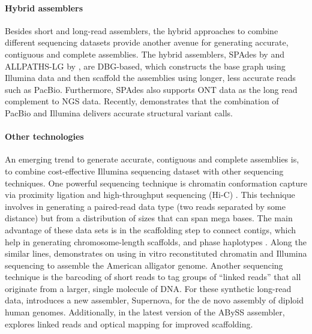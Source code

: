 \paragraph{Hybrid assemblers}
Besides short and long-read assemblers, the hybrid approaches to combine different sequencing datasets provide another avenue for generating accurate, contiguous and complete assemblies. 
The hybrid assemblers, SPAdes by \cite{bankevich2012spades} and ALLPATHS-LG by \cite{gnerre2011high}, are DBG-based, which constructs the base graph using Illumina data and then scaffold the assemblies using longer, less accurate reads such as PacBio. 
Furthermore, SPAdes also supports ONT data as the long read complement to NGS data. 
Recently, \cite{fan2017hysa} demonstrates that the combination of PacBio and Illumina delivers accurate structural variant calls.

\paragraph{Other technologies}
An emerging trend to generate accurate, contiguous and complete assemblies is, to combine cost-effective Illumina sequencing dataset with other sequencing techniques. 
One powerful sequencing technique is chromatin conformation capture via proximity ligation and high-throughput sequencing (Hi-C) \citep{lieberman2009comprehensive}. 
This technique involves in generating a paired-read data type (two reads separated by some distance) but from a distribution of sizes that can span mega bases. 
The main advantage of these data sets is in the scaffolding step to connect contigs, which help in generating chromosome-length scaffolds, and phase haplotypes \citep{burton2013chromosome, selvaraj2013whole}. 
Along the similar lines, \cite{rice2017improved} demonstrates on using in vitro reconstituted chromatin and Illumina sequencing to assemble the American alligator genome. 
Another sequencing technique is the barcoding of short reads to tag groups of ``linked reads'' that all originate from a larger, single molecule of DNA. 
For these synthetic long-read data, \cite{weisenfeld2017direct} introduces a new assembler, Supernova, for the de novo assembly of diploid human genomes. 
Additionally, in the latest version of the ABySS assembler, \cite{jackman2017abyss} explores linked reads and optical mapping for improved scaffolding.
